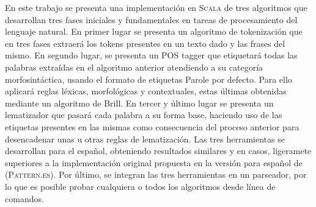 
En este trabajo se presenta una implementación en \textsc{Scala} de tres algoritmos que desarrollan tres fases iniciales y fundamentales en tareas de procesamiento del lenguaje natural. En primer lugar se presenta un algoritmo de tokenización que en tres fases extraerá los tokens presentes en un texto dado y las frases del mismo. En segundo lugar, se presenta un POS tagger que etiquetará todas las palabras extraídas en el algoritmo anterior atendiendo a su categoría morfosintáctica, usando el formato de etiquetas \textsf{Parole} por defecto. Para ello aplicará reglas léxicas, morfológicas y contextuales, estas últimas obtenidas mediante un algoritmo de Brill. En tercer y último lugar se presenta un lematizador que pasará cada palabra a su forma base, haciendo uso de las etiquetas presentes en las mismas como consecuencia del proceso anterior para desencadenar unas u otras reglas de lematización. 
\newline
Las tres herramientas se desarrollan para el español, obteniendo resultados similares y en casos, ligeramete superiores a la implementación original propuesta en la versión para español de \citet{smedt2012pattern} (\textsc{Pattern.es}). Por último, se integran las tres herramientas en un parseador, por lo que es posible probar cualquiera o todos los algoritmos desde línea de comandos. 





